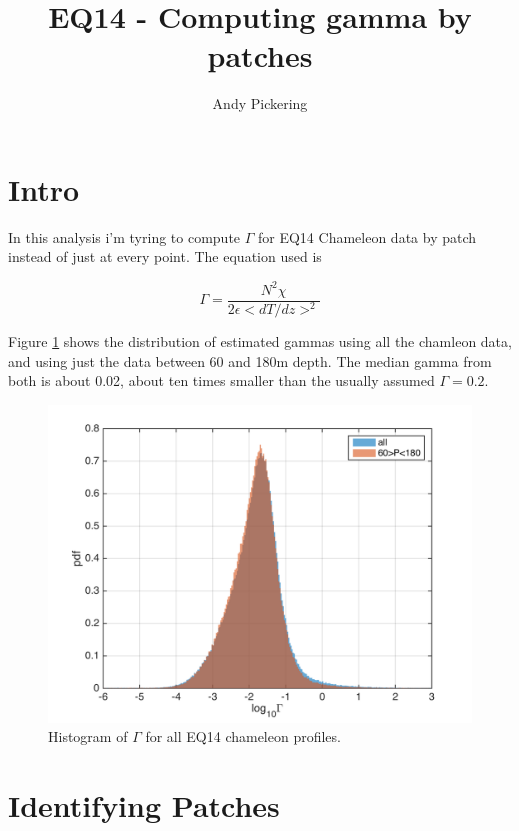\documentclass[11pt]{article}
\title{EQ14 - Computing gamma by patches}
\author{Andy Pickering}
\begin{document}
\maketitle

\tableofcontents
\newpage


\section{Intro}

In this analysis i'm tyring to compute $\Gamma$ for EQ14 Chameleon data by patch instead of just at every point. The equation used is 

\begin{equation}
\Gamma=\frac{N^2 \chi}{2\epsilon <dT/dz>^2}
\end{equation}

Figure \ref{gam_cham} shows the distribution of estimated gammas using all the chamleon data, and using just the data between 60 and 180m depth. The median gamma from both is about 0.02, about ten times smaller than the usually assumed $\Gamma=0.2$.

\begin{figure}[htbp]
\includegraphics[scale=0.8]{gam_cham_hist.png}
\caption{Histogram of $\Gamma$ for all EQ14 chameleon profiles.}
\label{gam_cham}
\end{figure}


\section{Identifying Patches}
\end{document}
